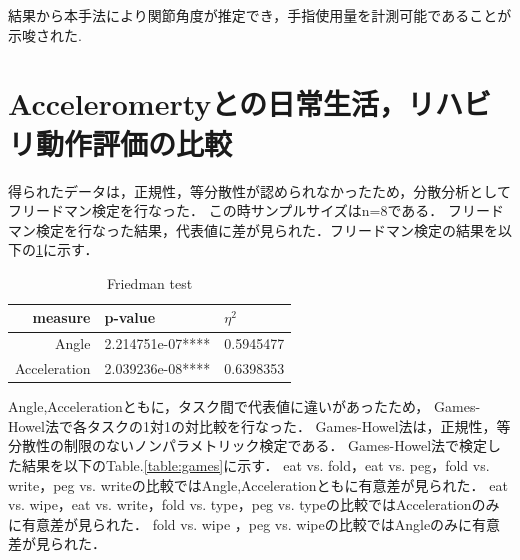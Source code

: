 結果から本手法により関節角度が推定でき，手指使用量を計測可能であることが示唆された.


\section{Acceleromertyとの日常生活，リハビリ動作評価の比較}

得られたデータは，正規性，等分散性が認められなかったため，分散分析としてフリードマン検定を行なった．
この時サンプルサイズはn=8である．
フリードマン検定を行なった結果，代表値に差が見られた．フリードマン検定の結果を以下の\ref{table:friedman}に示す．

\begin{table}[H]
  \caption{Friedman test}
  \label{table:friedman}
  \centering
  \begin{tabular}{rll}
    \hline 
measure &  p-value  & $\eta^2$\\
    \hline \hline
Angle     & 2.214751e-07****&0.5945477\\
Acceleration  & 2.039236e-08****&0.6398353\\

    \hline
  \end{tabular}
\end{table}

Angle,Accelerationともに，タスク間で代表値に違いがあったため，
Games-Howel法で各タスクの1対1の対比較を行なった．
Games-Howel法は，正規性，等分散性の制限のないノンパラメトリック検定である．
Games-Howel法で検定した結果を以下のTable.\ref{table:games}に示す．
eat vs. fold，eat vs. peg，fold vs. write，peg vs. writeの比較ではAngle,Accelerationともに有意差が見られた．
eat vs. wipe，eat vs. write，fold vs. type，peg vs. typeの比較ではAccelerationのみに有意差が見られた．
fold vs. wipe ，peg vs. wipeの比較ではAngleのみに有意差が見られた．

